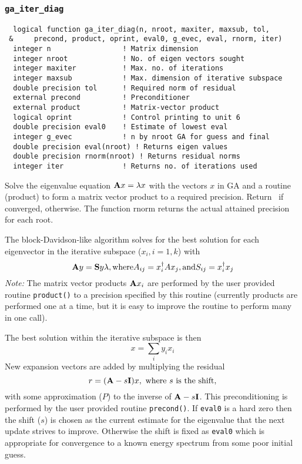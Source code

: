 \subsubsection{{\tt ga\_iter\_diag}}
\begin{verbatim}
  logical function ga_iter_diag(n, nroot, maxiter, maxsub, tol,
 &     precond, product, oprint, eval0, g_evec, eval, rnorm, iter)
  integer n                 ! Matrix dimension
  integer nroot             ! No. of eigen vectors sought
  integer maxiter           ! Max. no. of iterations
  integer maxsub            ! Max. dimension of iterative subspace
  double precision tol      ! Required norm of residual
  external precond          ! Preconditioner
  external product          ! Matrix-vector product
  logical oprint            ! Control printing to unit 6
  double precision eval0    ! Estimate of lowest eval
  integer g_evec            ! n by nroot GA for guess and final
  double precision eval(nroot) ! Returns eigen values
  double precision rnorm(nroot) ! Returns residual norms
  integer iter              ! Returns no. of iterations used
\end{verbatim}
  Solve the eigenvalue equation ${\bf A}x = \lambda x$ with the
vectors $x$ in GA and a routine (product) to form a matrix vector
product to a required precision.  Return \TRUE\ if converged, \FALSE
otherwise. The function rnorm returns the actual attained precision for each root.
     
The block-Davidson-like algorithm solves for the best solution for
each eigenvector in the iterative subspace ($x_i, i = 1, k$) with
\begin{displaymath}
  {\bf A} y = {\bf S}y\lambda, \mbox{where} A_{ij} = x_i^{\dagger} A x_j,
\mbox{and} S_{ij} = x_i^{\dagger} x_j
\end{displaymath}
{\em Note:} The matrix vector products ${\bf A}x_i$ are performed by the user
provided routine \verb+product()+ to a precision specified by this routine
(currently products are performed one at a time, but it is easy to
improve the routine to perform many in one call).
     
The best solution within the iterative subspace is then
\begin{displaymath}
  x = \sum_i y_i x_i
\end{displaymath}
New expansion vectors are added by multiplying the residual
\begin{displaymath}
  r = ({\bf A} - s {\bf I}) x, \mbox{ where } s \mbox{ is the shift},
\end{displaymath}
with some approximation ($P$) to the inverse of ${\bf A}-s{\bf I}$.
This preconditioning is performed by the user provided routine
\verb+precond()+.  If \verb+eval0+ is a hard zero then the shift ($s$) is
chosen as the current estimate for the eigenvalue that the next update
strives to improve.  Otherwise the shift is fixed as \verb+eval0+
which is appropriate for convergence to a known energy spectrum from
some poor initial guess.
     

